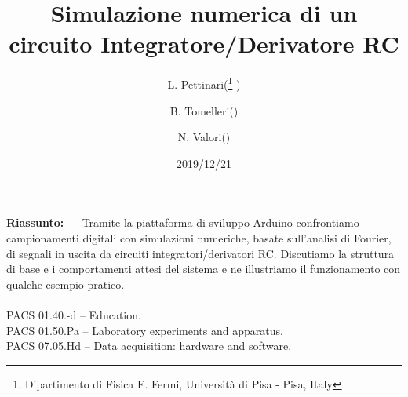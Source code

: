\documentclass{article}[a4paper, oneside ,11pt]
\title{Simulazione numerica di un circuito Integratore/Derivatore RC}
\author{L. Pettinari(\thanks{Dipartimento di Fisica E. Fermi, Universit\`a di Pisa - Pisa, Italy} ) \and B. Tomelleri(\protect\footnotemark[1] ) \and N. Valori(\protect\footnotemark[1] )}
\date{2019/12/21}
\begin{document}
\maketitle
\begin{mdframed}
\textbf{Riassunto:} --- Tramite la piattaforma di sviluppo Arduino\cite{arduino} confrontiamo campionamenti digitali con simulazioni numeriche, basate sull'analisi di Fourier, di segnali in uscita da circuiti integratori/derivatori RC. Discutiamo la struttura di base e i comportamenti attesi del sistema e ne illustriamo il funzionamento con qualche esempio pratico.\\\\
PACS 01.40.-d – Education.\\
PACS 01.50.Pa – Laboratory experiments and apparatus.\\
PACS 07.05.Hd – Data acquisition: hardware and software.
\end{mdframed}
\end{document}
